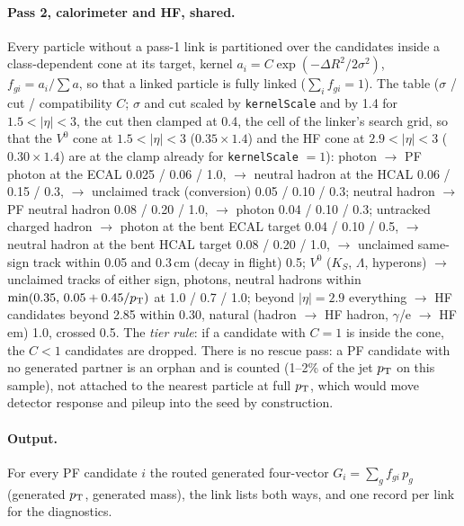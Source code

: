 \paragraph{Pass 2, calorimeter and HF, shared.} Every particle without a pass-1
link is partitioned over the candidates inside a class-dependent cone at its
target, kernel $a_i = C\exp(-\Delta R^2/2\sigma^2)$, $f_{gi} = a_i/\sum a$, so
that a linked particle is fully linked ($\sum_i f_{gi} = 1$). The table
($\sigma$ / cut / compatibility $C$; $\sigma$ and cut scaled by
\texttt{kernelScale} and by 1.4 for $1.5 < |\eta| < 3$, the cut then clamped at
0.4, the cell of the linker's search grid, so that the $V^0$ cone at
$1.5<|\eta|<3$ ($0.35\times1.4$) and the HF cone at $2.9<|\eta|<3$
($0.30\times1.4$) are at the clamp already for \texttt{kernelScale} $=1$):
photon $\to$ PF photon
at the ECAL 0.025 / 0.06 / 1.0, $\to$ neutral hadron at the HCAL 0.06 / 0.15 / 0.3,
$\to$ unclaimed track (conversion) 0.05 / 0.10 / 0.3; neutral hadron $\to$ PF
neutral hadron 0.08 / 0.20 / 1.0, $\to$ photon 0.04 / 0.10 / 0.3; untracked
charged hadron $\to$ photon at the bent ECAL target 0.04 / 0.10 / 0.5, $\to$
neutral hadron at the bent HCAL target 0.08 / 0.20 / 1.0, $\to$ unclaimed
same-sign track within 0.05 and 0.3\,cm (decay in flight) 0.5; $V^0$ ($K_S$,
$\Lambda$, hyperons) $\to$ unclaimed tracks of either sign, photons, neutral
hadrons within $\min(0.35,\, 0.05 + 0.45/p_{\mathrm{T}})$ at 1.0 / 0.7 / 1.0; beyond
$|\eta| = 2.9$ everything $\to$ HF candidates beyond 2.85 within 0.30, natural
(hadron $\to$ HF hadron, $\gamma$/e $\to$ HF em) 1.0, crossed 0.5. The
\emph{tier rule}: if a candidate with $C = 1$ is inside the cone, the $C < 1$
candidates are dropped. There is no rescue pass: a PF candidate with no
generated partner is an orphan and is counted (1--2\% of the jet $p_{\mathrm{T}}$ on this
sample), not attached to the nearest particle at full $p_{\mathrm{T}}$, which would move
detector response and pileup into the seed by construction.

\paragraph{Output.} For every PF candidate $i$ the routed generated
four-vector $G_i = \sum_g f_{gi}\, p_g$ (generated $p_{\mathrm{T}}$, generated mass), the
link lists both ways, and one record per link for the diagnostics.

